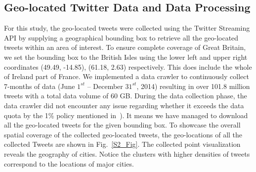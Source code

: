\documentclass[]{tGIS2e}
\begin{document}
\subsection{Geo-located Twitter Data and Data Processing}
For this study, the geo-located tweets were collected using the Twitter Streaming API by supplying a geographical bounding box to retrieve all the  geo-located tweets within an area of interest. 
To ensure complete coverage of Great Britain, we set the bounding box to the British Isles using the lower left and upper right coordinates (49.49, -14.85), (61.18, 2.63) respectively. This does include the whole of Ireland part of France.
We implemented a data crawler to continuously collect 7-months of data (June $1^{st}$ -- December $31^{st}$, 2014) resulting in over 101.8 million tweets with a total data volume of 60 GB.
During the data collection phase, the data crawler did not encounter any issue regarding whether it exceeds the data quota by the 1\% policy mentioned in~\citep{hawelka}). It means we have managed to download all the geo-located tweets for the given bounding box.
To showcase the overall spatial coverage of the collected geo-located tweets, the geo-locations of all the collected Tweets are shown in Fig.~\ref{S2_Fig}.
The collected point visualization reveals the geography of cities.
Notice the clusters with higher densities of tweets correspond to the locations of major cities.
\end{document}
